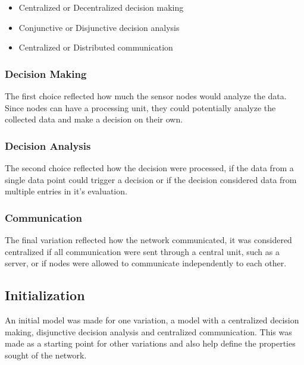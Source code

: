 \begin{itemize}
\item Centralized or Decentralized decision making
\item Conjunctive or Disjunctive decision analysis
\item Centralized or Distributed communication
\end{itemize}

\subsubsection{Decision Making}

The first choice reflected how much the sensor nodes would analyze the data. Since nodes can have a processing unit, they could potentially analyze the collected data and make a decision on their own. 

\subsubsection{Decision Analysis}
The second choice reflected how the decision were processed, if the data from a single data point could trigger a decision or if the decision considered data from multiple entries in it's evaluation.

\subsubsection{Communication}

The final variation reflected how the network communicated, it was considered centralized if all communication were sent through a central unit, such as a server, or if nodes were allowed to communicate independently to each other.

\subsection{Initialization}

An initial model was made for one variation, a model with a centralized decision making, disjunctive decision analysis and centralized communication. This was made as a starting point for other variations and also help define the properties sought of the network.



